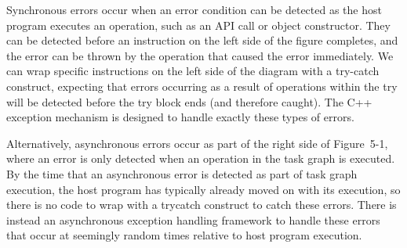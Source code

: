Synchronous errors occur when an error condition can be detected as the host program executes an operation, such as an API call or object constructor. They can be detected before an instruction on the left side of the figure completes, and the error can be thrown by the operation that caused the error immediately. We can wrap specific instructions on the left side of the diagram with a try-catch construct, expecting that errors occurring as a result of operations within the try will be detected before the try block ends (and therefore caught). The C++ exception mechanism is designed to handle exactly these types of errors.\par

Alternatively, asynchronous errors occur as part of the right side of Figure 5-1, where an error is only detected when an operation in the task graph is executed. By the time that an asynchronous error is detected as part of task graph execution, the host program has typically already moved on with its execution, so there is no code to wrap with a trycatch construct to catch these errors. There is instead an asynchronous exception handling framework to handle these errors that occur at seemingly random times relative to host program execution.\par










